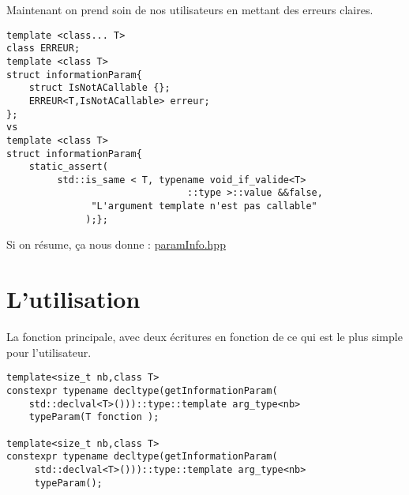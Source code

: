 \documentclass{beamer}
\begin{document}
 

\begin{frame}[containsverbatim]
Maintenant on prend soin de nos utilisateurs en mettant des erreurs claires. 
\begin{lstlisting}
template <class... T>
class ERREUR;
template <class T>
struct informationParam{
    struct IsNotACallable {};
    ERREUR<T,IsNotACallable> erreur;
};
vs
template <class T>
struct informationParam{
    static_assert(
         std::is_same < T, typename void_if_valide<T>
                                ::type >::value &&false,
               "L'argument template n'est pas callable"
              );};

\end{lstlisting}
\end{frame}


\begin{frame}
Si on résume, ça nous donne : 
	\href{run:../code/src/paramInfo.hpp}{paramInfo.hpp}\\


\end{frame}


\section{L'utilisation}
%

\begin{frame}[containsverbatim]
La fonction principale, avec deux écritures en fonction de ce qui est le plus simple pour l'utilisateur. 
\begin{lstlisting}
template<size_t nb,class T>
constexpr typename decltype(getInformationParam(
    std::declval<T>()))::type::template arg_type<nb>
    typeParam(T fonction );

template<size_t nb,class T>
constexpr typename decltype(getInformationParam(
     std::declval<T>()))::type::template arg_type<nb>
     typeParam();
\end{lstlisting}

\end{frame} 
\end{document}
